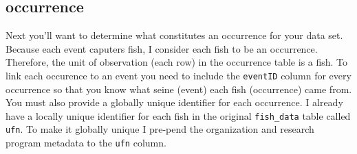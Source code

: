 \documentclass[
]{book}
\newenvironment{Shaded}{\begin{snugshade}}{\end{snugshade}}
\newcommand{\AttributeTok}[1]{\textcolor[rgb]{0.77,0.63,0.00}{#1}}
\newcommand{\CommentTok}[1]{\textcolor[rgb]{0.56,0.35,0.01}{\textit{#1}}}
\newcommand{\DecValTok}[1]{\textcolor[rgb]{0.00,0.00,0.81}{#1}}
\newcommand{\FunctionTok}[1]{\textcolor[rgb]{0.00,0.00,0.00}{#1}}
\newcommand{\NormalTok}[1]{#1}
\newcommand{\OtherTok}[1]{\textcolor[rgb]{0.56,0.35,0.01}{#1}}
\newcommand{\SpecialCharTok}[1]{\textcolor[rgb]{0.00,0.00,0.00}{#1}}
\newcommand{\StringTok}[1]{\textcolor[rgb]{0.31,0.60,0.02}{#1}}
\begin{document}
\begin{Shaded}
\end{Shaded}

\hypertarget{occurrence}{%
\subsection{occurrence}\label{occurrence}}

Next you'll want to determine what constitutes an occurrence for your data set. Because each event caputers fish, I consider each fish to be an occurrence. Therefore, the unit of observation (each row) in the occurrence table is a fish. To link each occurence to an event you need to include the \texttt{eventID} column for every occurrence so that you know what seine (event) each fish (occurrence) came from. You must also provide a globally unique identifier for each occurrence. I already have a locally unique identifier for each fish in the original \texttt{fish\_data} table called \texttt{ufn}. To make it globally unique I pre-pend the organization and research program metadata to the \texttt{ufn} column.
\end{document}
